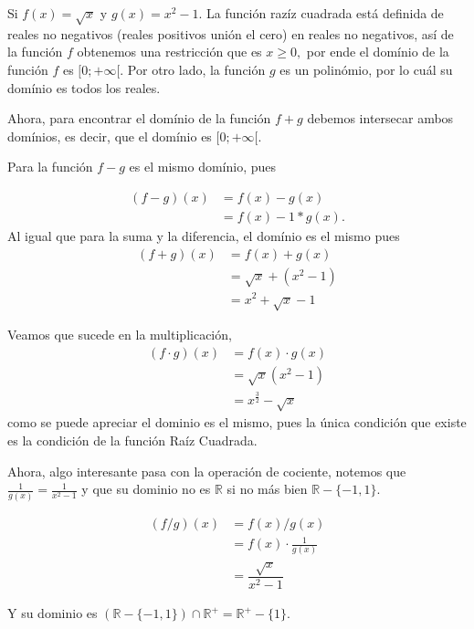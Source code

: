 \begin{example}
	Si \(f(x)=\sqrt{x}\) y \(g(x)=x^2-1\). La funci\'on raz\'iz cuadrada est\'a definida de reales no negativos (reales positivos uni\'on el cero) en reales no negativos, as\'i de la funci\'on \(f\) obtenemos una restricci\'on que es \(x\geq 0,\) por ende el dom\'inio de la funci\'on \(f\) es \([0;+\infty[.\) Por otro lado, la funci\'on \(g\) es un polin\'omio, por lo cu\'al su dom\'inio es todos los reales.

Ahora, para encontrar el dom\'inio de la funci\'on \(f+g\) debemos intersecar ambos dom\'inios, es decir, que el dom\'inio es \({[0;+\infty[}\).

Para la funci\'on \(f-g\) es el mismo dom\'inio, pues

\begin{align*}
	(f-g)(x)&=f(x)-g(x)\\
	&=f(x)-1*g(x).
\end{align*}
Al igual que para la suma y la diferencia, el dom\'inio es el mismo pues
\begin{align*}
	(f+ g)(x)&=f(x)+ g(x)\\
	&=\sqrt{x}+(x^2-1)\\
	&=x^2+\sqrt{x}-1
\end{align*}

Veamos que sucede en la multiplicaci\'on, 
\begin{align*}
(f\cdot g)(x)&=f(x)\cdot g(x)\\
&=\sqrt{x}\left(x^2-1\right)\\
&=x^\frac{3}{2}-\sqrt{x}
\end{align*}
como se puede apreciar el dominio es el mismo, pues la \'unica condici\'on que existe es la condici\'on de la funci\'on Ra\'iz Cuadrada.\newline

Ahora, algo interesante pasa con la operaci\'on de cociente, notemos que\(\frac{1}{g(x)}=\frac{1}{x^2-1}\) y que su dominio no es \(\mathbb{R}\) si no m\'as bien \(\mathbb{R}-\{-1,1\}.\)

\begin{align*}
(f/g)(x)&=f(x)/g(x)\\
&=f(x)\cdot\frac{1}{g(x)}\\
&=\dfrac{\sqrt{x}}{x^2-1}
\end{align*}

Y su dominio es \(\left(\mathbb{R}-\{-1,1\}\right)\cap\mathbb{R}^+=\mathbb{R}^+-\{1\}.\)\newline
\end{example}

